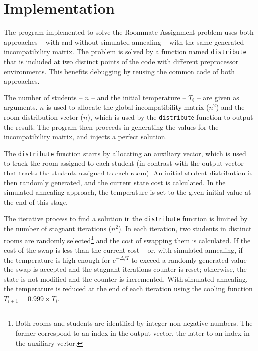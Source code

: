 \section{Implementation}
\label{sec:implementation}
The program implemented to solve the Roommate Assignment problem uses both approaches -- with and without simulated annealing -- with the same generated incompatibility matrix. The problem is solved by a function named \texttt{distribute} that is included at two distinct points of the code with different preprocessor environments. This benefits debugging by reusing the common code of both approaches.

The number of students -- $n$ -- and the initial temperature -- $T_{0}$ -- are given as arguments. $n$ is used to allocate the global incompatibility matrix ($n^{2}$) and the room distribution vector ($n$), which is used by the \texttt{distribute} function to output the result. The program then proceeds in generating the values for the incompatibility matrix, and injects a perfect solution.

The \texttt{distribute} function starts by allocating an auxiliary vector, which is used to track the room assigned to each student (in contrast with the output vector that tracks the students assigned to each room). An initial student distribution is then randomly generated, and the current state cost is calculated. In the simulated annealing approach, the temperature is set to the given initial value at the end of this stage.

The iterative process to find a solution in the \texttt{distribute} function is limited by the number of stagnant iterations ($n^{2}$). In each iteration, two students in distinct rooms are randomly selected\footnote{Both rooms and students are identified by integer non-negative numbers. The former correspond to an index in the output vector, the latter to an index in the auxiliary vector.} and the cost of swapping them is calculated. If the cost of the swap is less than the current cost -- or, with simulated annealing, if the temperature is high enough for $e^{-\Delta/T}$ to exceed a randomly generated value -- the swap is accepted and the stagnant iterations counter is reset; otherwise, the state is not modified and the counter is incremented. With simulated annealing, the temperature is reduced at the end of each iteration using the cooling function $T_{i+1}=0.999\times T_{i}$.

